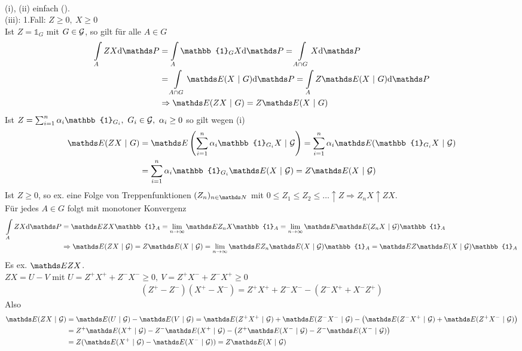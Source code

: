 \\
(i), (ii) einfach (\checkmark).\\
(iii): 1.Fall: $Z\ge 0,~X\ge0$\\
Ist $Z=\mathbb{1}_G$ mit $G\in \mathcal{G}$, so gilt für alle $A\in G$ 
\begin{equation*}
\begin{aligned}
	\int\limits_A ZX\dint \Pw &=\int\limits_A \mathbb{1}_G X\dint \Pw =\int\limits_{A\cap G}X\dint\Pw\\
	&= \int\limits_{A\cap G}\E(X~|~G)\dint\Pw =\int\limits_A Z\E(X~|~G)\dint\Pw\\
	&\Rightarrow \E(ZX~|~G)=Z\E(X~|~G)
\end{aligned}
\end{equation*}
Ist $Z=\sum_{i=1}^{n}\alpha_i \mathbb{1}_{G_i},~ G_i\in \G,~\alpha_i\ge 0$ so gilt wegen (i)
\begin{equation*}
\begin{aligned}
	\E(ZX~|~G)&=\E\enbrace{\sum_{i=1}^{n}\alpha_i\mathbb{1}_{G_i}X~|~\G}= \sum_{i=1}^{n}\alpha_i\E(\mathbb{1}_{G_i}X~|~\G)\\
	&= \sum_{i=1}^{n}\alpha_i\mathbb{1}_{G_i}\E(X~|~\G)=Z\E(X~|~\G)
\end{aligned}
\end{equation*}
Ist $Z\ge0$, so ex. eine Folge von Treppenfunktionen $(Z_n)_{n\in \N}$ mit $0\le Z_1\le Z_2\le \dots \uparrow Z \Rightarrow Z_nX\uparrow ZX$.\\
Für jedes $A\in G$ folgt mit monotoner Konvergenz 
\begin{equation*}
\begin{aligned}
	\int\limits_A ZX\dint\Pw &= \E ZX\mathbb{1}_A = \lim\limits_{n\to\infty}\E Z_nX\mathbb{1}_A =\lim\limits_{n\to\infty} \E\E(Z_nX~|~\G)\mathbb{1}_A\\
	&\Rightarrow \E(ZX~|~\G)=Z\E(X~|~\G)=\lim\limits_{n\to \infty}\E Z_n\E(X~|~\G)\mathbb{1}_A=\E Z\E(X~|~\G)\mathbb{1}_A
\end{aligned}
\end{equation*}
Es ex. $\E ZX$.\\ $ZX=U-V$ mit $U=Z^+X^++Z^-X^-\ge0,~V=Z^+X^-+Z^-X^+\ge0$
\begin{equation*}
\begin{aligned}
	(Z^+-Z^-)(X^+-X^-)= Z^+X^++Z^-X^- -(Z^-X^++X^-Z^+)
\end{aligned}
\end{equation*}
Also \begin{equation*}
\begin{aligned}
	\E(ZX~|~\G) &= \E(U~|~\G)-\E(V~|~\G)= \E(Z^+X^+~|~\G)+\E(Z^-X^-~|~\G)-\big(\E(Z^-X^+~|~\G)+\E(Z^+X^-~|~\G)\big)\\
	&= Z^+\E(X^+~|~\G)-Z^-\E(X^+~|~\G)-\big(Z^+\E(X^-~|~\G)-Z^-\E(X^-~|~\G)\big)\\
	&= Z(\E(X^+~|~\G)-\E(X^-~|~\G)) = Z\E(X~|~\G)
\end{aligned}
\end{equation*}

